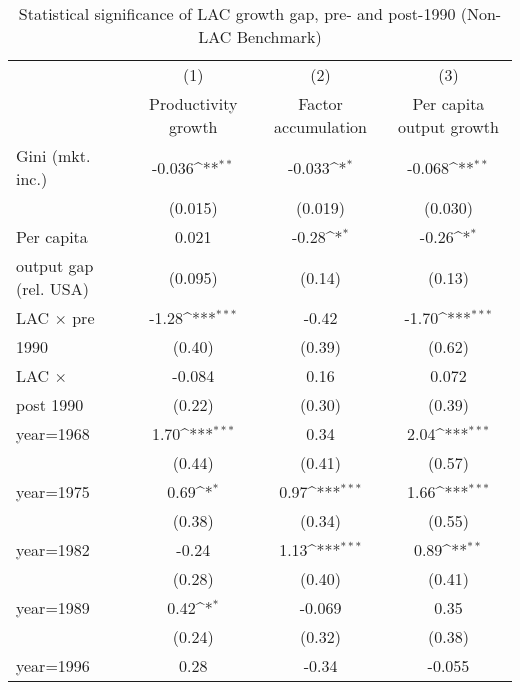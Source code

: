 \begin{sidewaystable}[htbp]\centering
\def\sym#1{\ifmmode^{#1}\else\(^{#1}\)\fi}
\caption{Statistical significance of LAC growth gap, pre- and post-1990 (Non-LAC Benchmark)}
\begin{tabular}{l*{3}{c}}
\toprule
                &\multicolumn{1}{c}{(1)}&\multicolumn{1}{c}{(2)}&\multicolumn{1}{c}{(3)}\\
                &\multicolumn{1}{c}{Productivity growth}&\multicolumn{1}{c}{Factor accumulation}&\multicolumn{1}{c}{Per capita output growth}\\
\midrule
Gini (mkt. inc.)&   -0.036\sym{**} &   -0.033\sym{*}  &   -0.068\sym{**} \\
                &  (0.015)         &  (0.019)         &  (0.030)         \\
\addlinespace
Per capita      &    0.021         &    -0.28\sym{*}  &    -0.26\sym{*}  \\
output gap (rel. USA)&  (0.095)         &   (0.14)         &   (0.13)         \\
\addlinespace
LAC $\times$ pre&    -1.28\sym{***}&    -0.42         &    -1.70\sym{***}\\
1990            &   (0.40)         &   (0.39)         &   (0.62)         \\
\addlinespace
LAC $\times$    &   -0.084         &     0.16         &    0.072         \\
post 1990       &   (0.22)         &   (0.30)         &   (0.39)         \\
\addlinespace
year=1968       &     1.70\sym{***}&     0.34         &     2.04\sym{***}\\
                &   (0.44)         &   (0.41)         &   (0.57)         \\
\addlinespace
year=1975       &     0.69\sym{*}  &     0.97\sym{***}&     1.66\sym{***}\\
                &   (0.38)         &   (0.34)         &   (0.55)         \\
\addlinespace
year=1982       &    -0.24         &     1.13\sym{***}&     0.89\sym{**} \\
                &   (0.28)         &   (0.40)         &   (0.41)         \\
\addlinespace
year=1989       &     0.42\sym{*}  &   -0.069         &     0.35         \\
                &   (0.24)         &   (0.32)         &   (0.38)         \\
\addlinespace
year=1996       &     0.28         &    -0.34         &   -0.055         \\

\end{tabular}
\end{sidewaystable}
